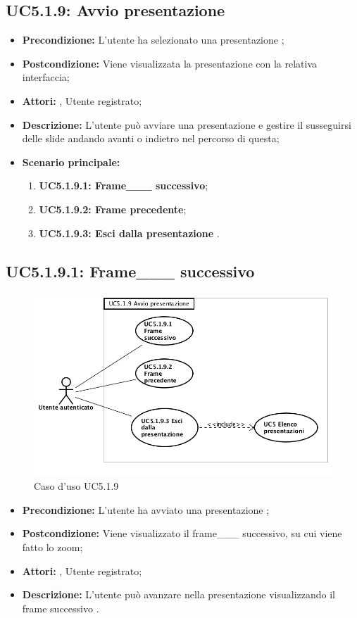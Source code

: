 \subsection{ UC5.1.9: Avvio presentazione }

\begin{itemize}
	\item \textbf{Precondizione:} L'utente ha selezionato una presentazione ;
	\item \textbf{Postcondizione:} Viene visualizzata la presentazione con la relativa interfaccia;
	\item \textbf{Attori:} , Utente registrato;
	\item \textbf{Descrizione:} L'utente può avviare una presentazione e gestire il susseguirsi delle slide andando avanti o indietro nel percorso di questa;
	\item \textbf{Scenario principale:}
	\begin{enumerate}
		\item \textbf{ UC5.1.9.1: Frame___ successivo};
		\item \textbf{ UC5.1.9.2: Frame precedente};
		\item \textbf{ UC5.1.9.3: Esci dalla presentazione }.
	\end{enumerate}
\end{itemize}
\subsection{ UC5.1.9.1: Frame___ successivo}

\begin{figure}[h]
	\begin{center}
	\includegraphics[scale=0.4]{diagram/UC5-1-9.png}
	\caption{Caso d'uso UC5.1.9}
	\end{center}
\end{figure}
\begin{itemize}
	\item \textbf{Precondizione:} L'utente ha avviato una presentazione ;
	\item \textbf{Postcondizione:} Viene visualizzato il frame___ successivo, su cui viene fatto lo zoom;
	\item \textbf{Attori:} , Utente registrato;
	\item \textbf{Descrizione:} L'utente può avanzare nella presentazione visualizzando il frame successivo .
\end{itemize}
